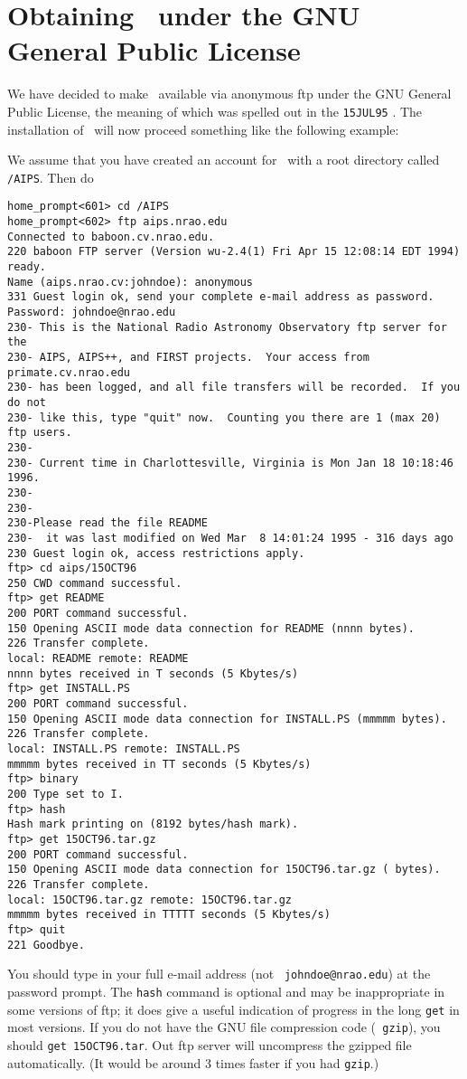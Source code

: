 \vfill\eject

\section{Obtaining \AIPS\ under the GNU General Public License}

We have decided to make \AIPS\ available via anonymous ftp under the
GNU General Public License, the meaning of which was spelled out in
the {\tt 15JUL95} \hbox{\Aipsletter}.  The installation of \AIPS\ will
now proceed something like the following example:

We assume that you have created an account for \AIPS\ with a root
directory called \hbox{{\tt /AIPS}}.  Then do
\vskip -10pt
\begin{verbatim}
home_prompt<601> cd /AIPS
home_prompt<602> ftp aips.nrao.edu
Connected to baboon.cv.nrao.edu.
220 baboon FTP server (Version wu-2.4(1) Fri Apr 15 12:08:14 EDT 1994) ready.
Name (aips.nrao.cv:johndoe): anonymous
331 Guest login ok, send your complete e-mail address as password.
Password: johndoe@nrao.edu
230- This is the National Radio Astronomy Observatory ftp server for the
230- AIPS, AIPS++, and FIRST projects.  Your access from primate.cv.nrao.edu
230- has been logged, and all file transfers will be recorded.  If you do not
230- like this, type "quit" now.  Counting you there are 1 (max 20) ftp users.
230-
230- Current time in Charlottesville, Virginia is Mon Jan 18 10:18:46 1996.
230-
230-
230-Please read the file README
230-  it was last modified on Wed Mar  8 14:01:24 1995 - 316 days ago
230 Guest login ok, access restrictions apply.
ftp> cd aips/15OCT96
250 CWD command successful.
ftp> get README
200 PORT command successful.
150 Opening ASCII mode data connection for README (nnnn bytes).
226 Transfer complete.
local: README remote: README
nnnn bytes received in T seconds (5 Kbytes/s)
ftp> get INSTALL.PS
200 PORT command successful.
150 Opening ASCII mode data connection for INSTALL.PS (mmmmm bytes).
226 Transfer complete.
local: INSTALL.PS remote: INSTALL.PS
mmmmm bytes received in TT seconds (5 Kbytes/s)
ftp> binary
200 Type set to I.
ftp> hash
Hash mark printing on (8192 bytes/hash mark).
ftp> get 15OCT96.tar.gz
200 PORT command successful.
150 Opening ASCII mode data connection for 15OCT96.tar.gz ( bytes).
226 Transfer complete.
local: 15OCT96.tar.gz remote: 15OCT96.tar.gz
mmmmm bytes received in TTTTT seconds (5 Kbytes/s)
ftp> quit
221 Goodbye.
\end{verbatim}
\vskip -10pt
You should type in your full e-mail address (not {\tt
johndoe@nrao.edu}) at the password prompt.  The {\tt hash} command is
optional and may be inappropriate in some versions of ftp; it does
give a useful indication of progress in the long {\tt get} in most
versions.  If you do not have the GNU file compression code ({\tt
gzip}), you should {\tt get 15OCT96.tar}.  Out ftp server will
uncompress the gzipped file automatically.  (It would be around 3
times faster if you had {\tt gzip}.)

